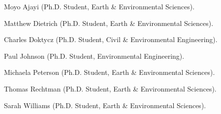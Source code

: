 \item Moyo Ajayi (Ph.D. Student, Earth \& Environmental Sciences).
\item Matthew Dietrich (Ph.D. Student, Earth \& Environmental Sciences).
\item Charles Doktycz (Ph.D. Student, Civil \& Environmental Engineering).
\item Paul Johnson (Ph.D. Student, Environmental Engineering).
\item Michaela Peterson (Ph.D. Student, Earth \& Environmental Sciences).
\item Thomas Rechtman (Ph.D. Student, Earth \& Environmental Sciences).
\item Sarah Williams (Ph.D. Student, Earth \& Environmental Sciences).

